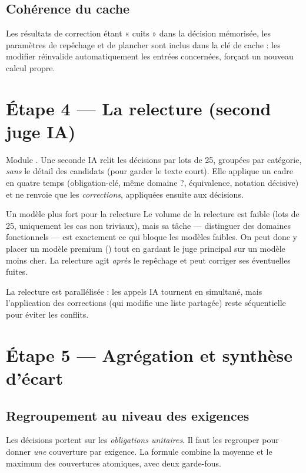 \documentclass[11pt,a4paper]{report}
\newcommand{\code}[1]{\texttt{\detokenize{#1}}}
\begin{document}
\section{Cohérence du cache}
Les résultats de correction étant « cuits » dans la décision mémorisée, les paramètres de repêchage et de plancher sont inclus dans la clé de cache : les modifier réinvalide automatiquement les entrées concernées, forçant un nouveau calcul propre.

\chapter{Étape 4 --- La relecture (second juge IA)}

Module \code{final_judge.py}. Une seconde IA relit les décisions par lots de 25, groupées par catégorie, \emph{sans} le détail des candidats (pour garder le texte court). Elle applique un cadre en quatre temps (obligation-clé, même domaine ?, équivalence, notation décisive) et ne renvoie que les \emph{corrections}, appliquées ensuite aux décisions.

\begin{keybox}{Un modèle plus fort pour la relecture}
Le volume de la relecture est faible (lots de 25, uniquement les cas non triviaux), mais sa tâche --- distinguer des domaines fonctionnels --- est exactement ce qui bloque les modèles faibles. On peut donc y placer un modèle premium (\code{gpt-5.4}) tout en gardant le juge principal sur un modèle moins cher. La relecture agit \emph{après} le repêchage et peut corriger ses éventuelles fuites.
\end{keybox}

La relecture est parallélisée : les appels IA tournent en simultané, mais l'application des corrections (qui modifie une liste partagée) reste séquentielle pour éviter les conflits.

\chapter{Étape 5 --- Agrégation et synthèse d'écart}

\section{Regroupement au niveau des exigences}
Les décisions portent sur les \emph{obligations unitaires}. Il faut les regrouper pour donner \emph{une} couverture par exigence. La formule combine la moyenne et le maximum des couvertures atomiques, avec deux garde-fous.
\end{document}
